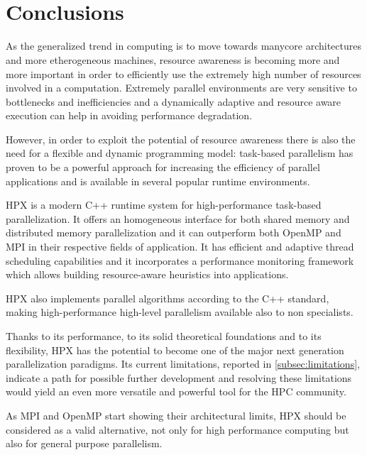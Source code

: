 
~\\~
\section{Conclusions} \label{sec:conclusions}
\enlargethispage{2\baselineskip} %
As the generalized trend in computing is to move towards manycore architectures and more etherogeneous machines, resource awareness is becoming more and more important in order to efficiently use the extremely high number of resources involved in a computation.
Extremely parallel environments are very sensitive to bottlenecks and inefficiencies and a dynamically adaptive and resource aware execution can help in avoiding performance degradation.

However, in order to exploit the potential of resource awareness there is also the need for a flexible and dynamic programming model: task-based parallelism has proven to be a powerful approach for increasing the efficiency of parallel applications and is available in several popular runtime environments.

HPX is a modern C++ runtime system for high-performance task-based parallelization. It offers an homogeneous interface for both shared memory and distributed memory parallelization and it can outperform both OpenMP and MPI in their respective fields of application. It has efficient and adaptive thread scheduling capabilities and it incorporates a performance monitoring framework which allows building resource-aware heuristics into applications.

HPX also implements parallel algorithms according to the C++ standard, making high-performance high-level parallelism available also to non specialists.

Thanks to its performance, to its solid theoretical foundations and to its flexibility, HPX has the potential to become one of the major next generation parallelization paradigms.
Its current limitations, reported in \ref{subsec:limitations}, indicate a path for possible further development and resolving these limitations would yield an even more versatile and powerful tool for the HPC community.

As MPI and OpenMP start showing their architectural limits, HPX should be considered as a valid alternative, not only for high performance computing but also for general purpose parallelism.

~\\~

